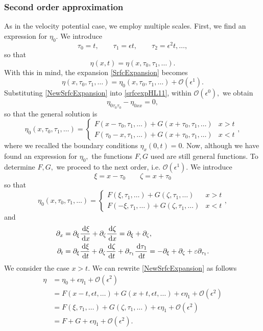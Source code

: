 \documentclass[10pt,reqno,oneside,a4paper, landscape]{article}
\begin{document}
\subsubsection*{Second order approximation}
As in the velocity potential case, we employ multiple scales. First, we find an expression for $\eta_0.$  We introduce 
\[ \tau_0 = t, \qquad \tau_1 = \epsilon t, \qquad \tau_2 = \epsilon^2 t, \ldots, \]
so that 
\[ \eta(x, t) = \eta(x, \tau_0, \tau_1, \ldots). \]
With this in mind, the expansion \eqref{SrfcExpansion} becomes
\begin{equation}\label{NewSrfcExpansion}
\eta(x, \tau_0, \tau_1, \ldots) = \eta_0(x, \tau_0, \tau_1, \ldots) + \mathcal{O}(\epsilon^1).
\end{equation}
Substituting \eqref{NewSrfcExpansion} into \eqref{srfcexpHL11}, within $\mathcal{O}(\epsilon^0),$ we obtain
\begin{equation}\label{1stOrderApprox}
\eta_{0\tau_0 \tau_0} - \eta_{0xx} = 0,
\end{equation}
so that the general solution is 
\[ \eta_0(x, \tau_0, \tau_1, \ldots ) = \begin{cases} F(x-\tau_0, \tau_1, \ldots ) + G(x+\tau_0, \tau_1, \ldots) & x>t \\ F(\tau_0-x, \tau_1, \ldots ) + G(x+\tau_0, \tau_1, \ldots) & x<t \end{cases}, \]
where we recalled the boundary conditions $\eta_x(0,t) = 0.$
Now, although we have found an expression for $\eta_0,$ the functions $F,G$ used are still general functions. To determine $F,G,$ we proceed to the next order, i.e. $\mathcal{O}(\epsilon^1).$ We introduce
\[ 
\xi = x-\tau_0 \qquad \zeta = x+ \tau_0
\]
so that 
\[ \eta_0(x, \tau_0, \tau_1, \ldots ) = \begin{cases} F(\xi, \tau_1, \ldots ) + G(\zeta, \tau_1, \ldots) & x>t \\ F(-\xi, \tau_1, \ldots ) + G(\zeta, \tau_1, \ldots) & x<t \end{cases}, \]
and
\begin{align*}
\partial_x &= \partial_\xi \frac{\,\mathrm{d} \xi}{\,\mathrm{d} x} + \partial_\zeta \frac{\,\mathrm{d} \zeta}{\,\mathrm{d} x} =\partial_\xi + \partial_\zeta, \\
\partial_t &= \partial_\xi \frac{\,\mathrm{d} \xi}{\,\mathrm{d} t} + \partial_\zeta \frac{\,\mathrm{d} \zeta}{\,\mathrm{d} t} + \partial_{\tau_1}\frac{\,\mathrm{d} \tau_1}{\,\mathrm{d} t} = - \partial_\xi + \partial_\zeta + \varepsilon \partial_{\tau_1}.
\end{align*}
We consider the case $x>t.$ We can rewrite \eqref{NewSrfcExpansion} as follows
\begin{align*}
\eta &= \eta_0 + \epsilon \eta_1 + \mathcal{O}(\epsilon^2)  \\
&= F(x-t, \epsilon t, \ldots) + G(x+t, \epsilon t, \ldots) + \epsilon \eta_1 + \mathcal{O}(\epsilon^2) \\
&= F(\xi, \tau_1, \ldots) + G(\zeta, \tau_1, \ldots) + \epsilon \eta_1 + \mathcal{O}(\epsilon^2) \\
&= F+G + \epsilon \eta_1 +  \mathcal{O}(\epsilon^2).
\end{align*}
\end{document}
